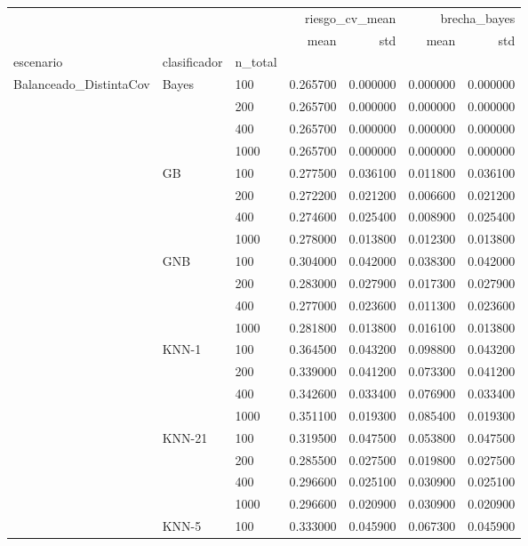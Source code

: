 \begin{tabular}{lllrrrr}
\toprule
 &  &  & \multicolumn{2}{r}{riesgo_cv_mean} & \multicolumn{2}{r}{brecha_bayes} \\
 &  &  & mean & std & mean & std \\
escenario & clasificador & n_total &  &  &  &  \\
\midrule
\multirow[t]{32}{*}{Balanceado_DistintaCov} & \multirow[t]{4}{*}{Bayes} & 100 & 0.265700 & 0.000000 & 0.000000 & 0.000000 \\
 &  & 200 & 0.265700 & 0.000000 & 0.000000 & 0.000000 \\
 &  & 400 & 0.265700 & 0.000000 & 0.000000 & 0.000000 \\
 &  & 1000 & 0.265700 & 0.000000 & 0.000000 & 0.000000 \\
\cline{2-7}
 & \multirow[t]{4}{*}{GB} & 100 & 0.277500 & 0.036100 & 0.011800 & 0.036100 \\
 &  & 200 & 0.272200 & 0.021200 & 0.006600 & 0.021200 \\
 &  & 400 & 0.274600 & 0.025400 & 0.008900 & 0.025400 \\
 &  & 1000 & 0.278000 & 0.013800 & 0.012300 & 0.013800 \\
\cline{2-7}
 & \multirow[t]{4}{*}{GNB} & 100 & 0.304000 & 0.042000 & 0.038300 & 0.042000 \\
 &  & 200 & 0.283000 & 0.027900 & 0.017300 & 0.027900 \\
 &  & 400 & 0.277000 & 0.023600 & 0.011300 & 0.023600 \\
 &  & 1000 & 0.281800 & 0.013800 & 0.016100 & 0.013800 \\
\cline{2-7}
 & \multirow[t]{4}{*}{KNN-1} & 100 & 0.364500 & 0.043200 & 0.098800 & 0.043200 \\
 &  & 200 & 0.339000 & 0.041200 & 0.073300 & 0.041200 \\
 &  & 400 & 0.342600 & 0.033400 & 0.076900 & 0.033400 \\
 &  & 1000 & 0.351100 & 0.019300 & 0.085400 & 0.019300 \\
\cline{2-7}
 & \multirow[t]{4}{*}{KNN-21} & 100 & 0.319500 & 0.047500 & 0.053800 & 0.047500 \\
 &  & 200 & 0.285500 & 0.027500 & 0.019800 & 0.027500 \\
 &  & 400 & 0.296600 & 0.025100 & 0.030900 & 0.025100 \\
 &  & 1000 & 0.296600 & 0.020900 & 0.030900 & 0.020900 \\
\cline{2-7}
 & \multirow[t]{4}{*}{KNN-5} & 100 & 0.333000 & 0.045900 & 0.067300 & 0.045900 \\

\end{tabular}
